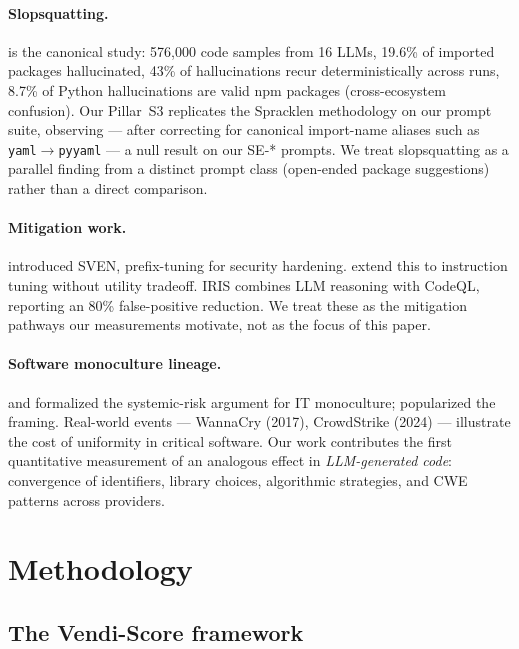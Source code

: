 \documentclass{article}
\newcommand{\code}[1]{\texttt{#1}}
\begin{document}
\paragraph{Slopsquatting.}
\citet{spracklen2025slopsquatting} is the canonical study: 576{,}000 code
samples from 16 LLMs, 19.6\% of imported packages hallucinated, 43\% of
hallucinations recur deterministically across runs, 8.7\% of Python
hallucinations are valid npm packages (cross-ecosystem confusion). Our
Pillar~S3 replicates the Spracklen methodology on our prompt suite, observing
--- after correcting for canonical import-name aliases such as
\code{yaml}$\to$\code{pyyaml} --- a null result on our SE-* prompts. We treat
slopsquatting as a parallel finding from a distinct prompt class
(open-ended package suggestions) rather than a direct comparison.

\paragraph{Mitigation work.}
\citet{he2023sven} introduced SVEN, prefix-tuning for security hardening.
\citet{he2024safecoder} extend this to instruction tuning without utility
tradeoff. IRIS \citep{li2025iris} combines LLM reasoning with CodeQL,
reporting an 80\% false-positive reduction. We treat these as the mitigation
pathways our measurements motivate, not as the focus of this paper.

\paragraph{Software monoculture lineage.}
\citet{geer2003} and \citet{birman2009} formalized the systemic-risk argument
for IT monoculture; \citet{schneier2010monoculture} popularized the framing.
Real-world events --- WannaCry (2017), CrowdStrike (2024) --- illustrate the
cost of uniformity in critical software. Our work contributes the first
quantitative measurement of an analogous effect in \emph{LLM-generated code}:
convergence of identifiers, library choices, algorithmic strategies, and CWE
patterns across providers.

\section{Methodology}
\label{sec:methodology}

\subsection{The Vendi-Score framework}
\end{document}
